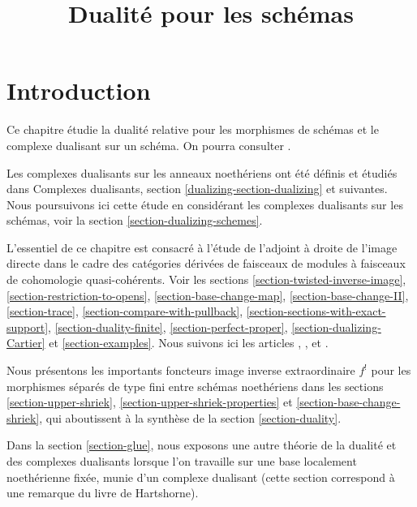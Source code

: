 

%


\title{Dualité pour les schémas}


\maketitle

\label{section-phantom}

\tableofcontents

\section{Introduction}
\label{section-introduction}

\noindent
Ce chapitre étudie la dualité relative pour les morphismes de schémas et le complexe dualisant sur un schéma. On pourra consulter \cite{RD}.

\medskip\noindent
Les complexes dualisants sur les anneaux noethériens ont été définis et étudiés dans Complexes dualisants, section \ref{dualizing-section-dualizing} et suivantes. Nous poursuivons ici cette étude en considérant les complexes dualisants sur les schémas, voir la section \ref{section-dualizing-schemes}.

\medskip\noindent
L'essentiel de ce chapitre est consacré à l'étude de l'adjoint à droite de l'image directe dans le cadre des catégories dérivées de faisceaux de modules à faisceaux de cohomologie quasi-cohérents. Voir les sections \ref{section-twisted-inverse-image}, \ref{section-restriction-to-opens}, \ref{section-base-change-map}, \ref{section-base-change-II}, \ref{section-trace}, \ref{section-compare-with-pullback}, \ref{section-sections-with-exact-support}, \ref{section-duality-finite}, \ref{section-perfect-proper}, \ref{section-dualizing-Cartier} et \ref{section-examples}. Nous suivons ici les articles \cite{Neeman-Grothendieck}, \cite{LN}, \cite{Lipman-notes} et \cite{Neeman-improvement}.

\medskip\noindent
Nous présentons les importants foncteurs image inverse extraordinaire $f^!$ pour les morphismes séparés de type fini entre schémas noethériens dans les sections \ref{section-upper-shriek}, \ref{section-upper-shriek-properties} et \ref{section-base-change-shriek}, qui aboutissent à la synthèse de la section \ref{section-duality}.

\medskip\noindent
Dans la section \ref{section-glue}, nous exposons une autre théorie de la dualité et des complexes dualisants lorsque l'on travaille sur une base localement noethérienne fixée, munie d'un complexe dualisant (cette section correspond à une remarque du livre de Hartshorne).

